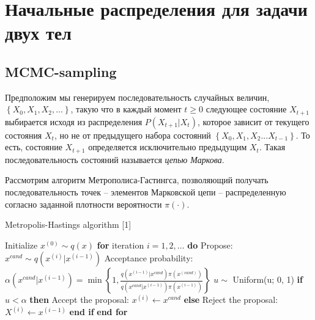 \documentclass[12pt]{article}
\newcommand{\lb}{\left(}
\newcommand{\rb}{\right)}
\begin{document}
\section{Начальные распределения для задачи двух тел}

\subsection{MCMC-sampling}

Предположим мы генерируем последовательность случайных величин, $\left\{ X_0, X_1, X_2, \dots \right\}$, такую что в каждый момент $t \geq 0$ следующее состояние $X_{t + 1}$ выбирается исходя из распределения $P \lb X_{t+1} | X_t \rb$, которое зависит от текущего состояния $X_t$, но не от предыдущего набора состояний $\left\{ X_0, X_1, X_2 ... X_{t - 1} \right\}$. То есть, состояние $X_{t + 1}$ определяется исключительно предыдущим $X_t$. Такая последовательность состояний называется \textit{цепью Маркова}. \par
Рассмотрим алгоритм Метрополиса-Гастингса, позволяющий получать последовательность точек -- элементов Марковской цепи -- распределенную согласно заданной плотности вероятности $\pi(\cdot)$.
\begin{algorithm}
\begin{algorithmic}[1]
		\caption{Metropolis-Hastings algorithm [1]}\label{metropolis}
\State Initialize $x^{(0)} \sim q(x)$
\State \textbf{for} iteration $i = 1, 2, \dots$ \textbf{do}
\State \quad Propose: $x^{cand} \sim q \lb x^{(i)} | x^{(i-1)} \rb$
\State \quad Acceptance probability:
\State \qquad $\alpha \lb x^{cand} | x^{(i-1)} \rb = \min \left\{ 1, \frac{q \lb x^{(i-1)} | x^{cand} \rb \pi \lb x^{(cand)} \rb }{ q \lb x^{cand} | x^{(i-1)} \rb \pi \lb x^{(i-1)} \rb} \right\}$
\State \quad $u \sim$ Uniform(u; 0, 1)
\State \quad \textbf{if} $u < \alpha$ \textbf{then}
\State \qquad Accept the proposal: $x^{(i)} \gets x^{cand}$
\State \quad \textbf{else}
\State \qquad Reject the proposal: $X^{(i)} \gets x^{(i-1)}$
\State \quad \textbf{end if}
\State \textbf{end for}
\end{algorithmic}
\end{algorithm}
\end{document}
